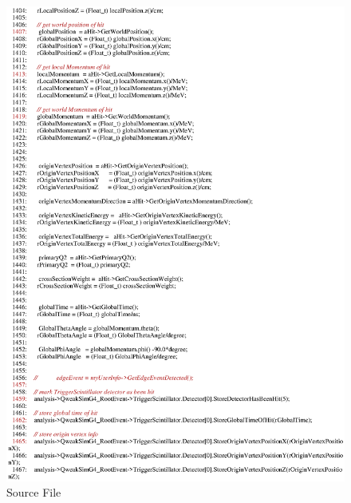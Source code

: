 \begin{figure}[h]
  \hspace{0cm}
  \includegraphics[scale=0.8]{./figures13/QweakSimEventAction.cc-p25.eps}
  \caption{Source File}
           \label{fig:XIII-SC-40}
\end{figure}

\clearpage

